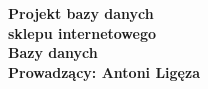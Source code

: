 \def\autor{Informatyka Stosowana III rok}
\def\tytul{\textbf{\LARGE Projektowanie bazy danych}}
\def\promotor{~}
\def\miejscerokwydania{Nowy Sącz \today}
\def\nazwauczelni{PAŃSTWOWA WYŻSZA SZKOŁA ZAWODOWA}
\def\imienia{INSTYTUT  TECHNICZNY}
\def\wydzial{Kierunek Informatyka Stosowana}

\thispagestyle{empty}
{
\hbox{}\textheight
\hspace{1cm}
\centering
\vbox{
\noindent\textbf{\Huge Projekt bazy danych \\ \vspace{0.3cm}sklepu internetowego}\vspace{0.5cm}\\
\noindent\textbf{\vspace{0.3cm}Bazy danych}\\
\noindent\textbf{Prowadzący: Antoni Ligęza}}\\}
